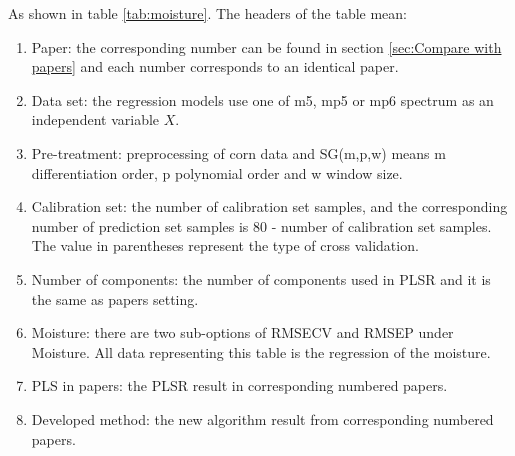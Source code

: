 \documentclass[a4paper,12pt,titlepage]{article} %
\numberwithin{equation}{section}  %
\begin{document}
	As shown in table \ref{tab:moisture}. The headers of the table mean:
	
	\begin{enumerate}
		
	\item Paper: the corresponding number can be found in section \ref{sec:Compare with papers} and each number corresponds to an identical paper.
	
	\item Data set: the regression models use one of m5, mp5 or mp6 spectrum as an independent variable $X$.
	
	\item Pre-treatment: preprocessing of corn data and SG(m,p,w) means m differentiation order, p polynomial order and w window size.
	
	\item Calibration set: the number of calibration set samples, and the corresponding number of prediction set samples is 80 - number of calibration set samples. The value in parentheses represent the type of cross validation.
	
	\item Number of components: the number of  components used in PLSR and it is the same as papers setting.
	
	\item Moisture: there are two sub-options of RMSECV and RMSEP under Moisture. All data representing this table is the regression of the moisture.
	
	\item PLS in papers: the PLSR result in corresponding numbered papers.
	
	\item Developed method: the new algorithm result from corresponding numbered papers.
	
\end{enumerate}
	
\end{document}
